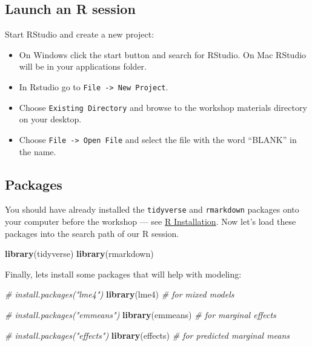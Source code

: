 \documentclass[
]{book}
\newenvironment{Shaded}{\begin{snugshade}}{\end{snugshade}}
\newcommand{\CommentTok}[1]{\textcolor[rgb]{0.56,0.35,0.01}{\textit{#1}}}
\newcommand{\KeywordTok}[1]{\textcolor[rgb]{0.13,0.29,0.53}{\textbf{#1}}}
\newcommand{\NormalTok}[1]{#1}
\providecommand{\tightlist}{%
  \setlength{\itemsep}{0pt}\setlength{\parskip}{0pt}}
\begin{document}
\hypertarget{launch-an-r-session}{%
\subsection{Launch an R session}\label{launch-an-r-session}}

Start RStudio and create a new project:

\begin{itemize}
\tightlist
\item
  On Windows click the start button and search for RStudio. On Mac
  RStudio will be in your applications folder.
\item
  In Rstudio go to \texttt{File\ -\textgreater{}\ New\ Project}.
\item
  Choose \texttt{Existing\ Directory} and browse to the workshop materials directory on your desktop.
\item
  Choose \texttt{File\ -\textgreater{}\ Open\ File} and select the file with the word ``BLANK'' in the name.
\end{itemize}

\hypertarget{packages}{%
\subsection{Packages}\label{packages}}

You should have already installed the \texttt{tidyverse} and \texttt{rmarkdown}
packages onto your computer before the workshop
--- see \href{./Rinstall.html}{R Installation}.
Now let's load these packages into the search path of our R session.

\begin{Shaded}
\begin{Highlighting}[]
\KeywordTok{library}\NormalTok{(tidyverse)}
\KeywordTok{library}\NormalTok{(rmarkdown)}
\end{Highlighting}
\end{Shaded}

Finally, lets install some packages that will help with modeling:

\begin{Shaded}
\begin{Highlighting}[]
\CommentTok{# install.packages("lme4")}
\KeywordTok{library}\NormalTok{(lme4)  }\CommentTok{# for mixed models}

\CommentTok{# install.packages("emmeans")}
\KeywordTok{library}\NormalTok{(emmeans)  }\CommentTok{# for marginal effects}

\CommentTok{# install.packages("effects")}
\KeywordTok{library}\NormalTok{(effects)  }\CommentTok{# for predicted marginal means}
\end{Highlighting}
\end{Shaded}
\end{document}
